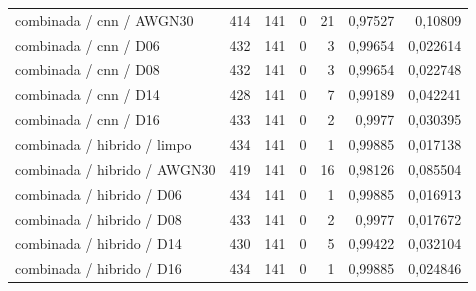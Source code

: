 \begin{longtable}{@{}p{.38\linewidth}rrrrrr@{}}
combinada /\allowbreak{} cnn /\allowbreak{} AWGN30 & 414 & 141 & 0 & 21 & 0,97527 & 0,10809\\
combinada /\allowbreak{} cnn /\allowbreak{} D06 & 432 & 141 & 0 & 3 & 0,99654 & 0,022614\\
combinada /\allowbreak{} cnn /\allowbreak{} D08 & 432 & 141 & 0 & 3 & 0,99654 & 0,022748\\
combinada /\allowbreak{} cnn /\allowbreak{} D14 & 428 & 141 & 0 & 7 & 0,99189 & 0,042241\\
combinada /\allowbreak{} cnn /\allowbreak{} D16 & 433 & 141 & 0 & 2 & 0,9977 & 0,030395\\
combinada /\allowbreak{} hibrido /\allowbreak{} limpo & 434 & 141 & 0 & 1 & 0,99885 & 0,017138\\
combinada /\allowbreak{} hibrido /\allowbreak{} AWGN30 & 419 & 141 & 0 & 16 & 0,98126 & 0,085504\\
combinada /\allowbreak{} hibrido /\allowbreak{} D06 & 434 & 141 & 0 & 1 & 0,99885 & 0,016913\\
combinada /\allowbreak{} hibrido /\allowbreak{} D08 & 433 & 141 & 0 & 2 & 0,9977 & 0,017672\\
combinada /\allowbreak{} hibrido /\allowbreak{} D14 & 430 & 141 & 0 & 5 & 0,99422 & 0,032104\\
combinada /\allowbreak{} hibrido /\allowbreak{} D16 & 434 & 141 & 0 & 1 & 0,99885 & 0,024846\\
\bottomrule\end{longtable}\normalsize

